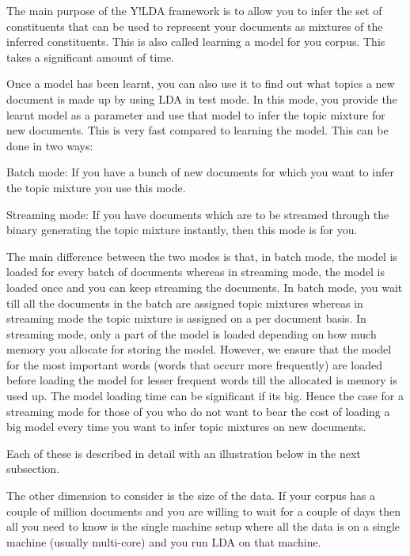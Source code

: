 The main purpose of the Y!LDA framework is to allow you to infer the set of constituents that can be used to represent your documents as mixtures of the inferred constituents. This is also called learning a model for you corpus. This takes a significant amount of time. 

Once a model has been learnt, you can also use it to find out what topics a new document is made up by using LDA in test mode. In this mode, you provide the learnt model as a parameter and use that model to infer the topic mixture for new documents. This is very fast compared to learning the model. This can be done in two ways: 
\begin{DoxyEnumerate}
\item 

Batch mode: If you have a bunch of new documents for which you want to infer the topic mixture you use this mode. 
\item 

Streaming mode: If you have documents which are to be streamed through the binary generating the topic mixture instantly, then this mode is for you. 
\end{DoxyEnumerate}

The main difference between the two modes is that, in batch mode, the model is loaded for every batch of documents whereas in streaming mode, the model is loaded once and you can keep streaming the documents. In batch mode, you wait till all the documents in the batch are assigned topic mixtures whereas in streaming mode the topic mixture is assigned on a per document basis. In streaming mode, only a part of the model is loaded depending on how much memory you allocate for storing the model. However, we ensure that the model for the most important words (words that occurr more frequently) are loaded before loading the model for lesser frequent words till the allocated is memory is used up. The model loading time can be significant if its big. Hence the case for a streaming mode for those of you who do not want to bear the cost of loading a big model every time you want to infer topic mixtures on new documents. 

Each of these is described in detail with an illustration below in the next subsection. 

The other dimension to consider is the size of the data. If your corpus has a couple of million documents and you are willing to wait for a couple of days then all you need to know is the single machine setup where all the data is on a single machine (usually multi-\/core) and you run LDA on that machine. 

